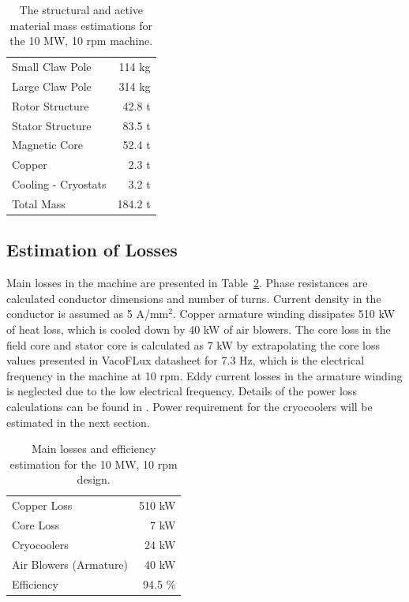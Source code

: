 \documentclass[12pt]{iopart}
\begin{document}
\begin{table}
  \centering
  \begin{tabular}{lr}
\hline
Small Claw Pole & 114 kg \\
Large Claw Pole & 314 kg \\
\hline
Rotor Structure & 42.8 t \\
Stator Structure & 83.5 t \\
\hline
Magnetic Core & 52.4 t\\
Copper & 2.3 t\\
Cooling - Cryostats & 3.2 t \\
\hline
Total Mass & 184.2 t \\
\hline
 \end{tabular}
  \caption{The structural and active material mass estimations for the 10 MW, 10 rpm machine.}
  \label{10MW_total_mass}
\end{table}


\subsection{Estimation of Losses}

Main losses in the machine are presented in Table~\ref{10MW_efficiency}. Phase resistances are calculated conductor dimensions and number of turns. Current density in the conductor is assumed as 5 A/mm$^2$. Copper armature winding dissipates 510 kW of heat loss, which is cooled down by 40 kW of air blowers. The core loss in the field core and stator core is calculated
as 7 kW by extrapolating the core loss values presented in VacoFLux datasheet for 7.3 Hz, which is the electrical frequency in the machine at 10 rpm. Eddy current losses in the armature winding is neglected due to the low electrical frequency. Details of the power loss calculations can be found in \cite{Keysan2014c}. Power requirement for the cryocoolers will be estimated in the next section.

\begin{table}[]
  \centering
  \begin{tabular}{lr}
\hline
Copper Loss & 510 kW \\
Core Loss & 7 kW \\
Cryocoolers & 24 kW \\
Air Blowers (Armature) & 40 kW \\
\hline
Efficiency & 94.5 \% \\
\hline
\end{tabular}
  \caption{Main losses and efficiency estimation for the 10 MW, 10 rpm design.}
  \label{10MW_efficiency}
\end{table}
\end{document}
